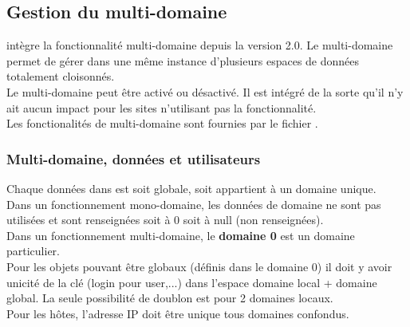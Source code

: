 

\subsection{Gestion du multi-domaine}
\label{of_domain}

\obm intègre la fonctionnalité multi-domaine depuis la version 2.0.
Le multi-domaine permet de gérer dans une même instance d'\obm plusieurs espaces de données totalement cloisonnés.\\

Le multi-domaine peut être activé ou désactivé. Il est intégré de la sorte qu'il n'y ait aucun impact pour les sites n'utilisant pas la fonctionnalité.\\

Les fonctionalités de multi-domaine sont fournies par le fichier .

\subsubsection{Multi-domaine, données et utilisateurs}

Chaque données dans \obm est soit globale, soit appartient à un domaine unique.\\

Dans un fonctionnement mono-domaine, les données de domaine ne sont pas utilisées et sont renseignées soit à 0 soit à null (non renseignées).\\

Dans un fonctionnement multi-domaine, le \textbf{domaine 0} est un domaine particulier.\\

Pour les objets pouvant être globaux (définis dans le domaine 0) il doit y avoir unicité de la clé (login pour user,...) dans l'espace domaine local + domaine global.
La seule possibilité de doublon est pour 2 domaines locaux.\\ 

Pour les hôtes, l'adresse IP doit être unique tous domaines confondus.

